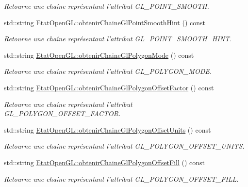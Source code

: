 \begin{DoxyCompactItemize}
\begin{DoxyCompactList}\small\item\em Retourne une chaîne représentant l'attribut G\-L\-\_\-\-P\-O\-I\-N\-T\-\_\-\-S\-M\-O\-O\-T\-H. \end{DoxyCompactList}\item 
std\-::string \hyperlink{group__utilitaire_gaa9c02409795d34b851b6da29f7f91c35}{Etat\-Open\-G\-L\-::obtenir\-Chaine\-Gl\-Point\-Smooth\-Hint} () const 
\begin{DoxyCompactList}\small\item\em Retourne une chaîne représentant l'attribut G\-L\-\_\-\-P\-O\-I\-N\-T\-\_\-\-S\-M\-O\-O\-T\-H\-\_\-\-H\-I\-N\-T. \end{DoxyCompactList}\item 
std\-::string \hyperlink{group__utilitaire_ga799784d6a719eb2c25ffd5854ec09aa8}{Etat\-Open\-G\-L\-::obtenir\-Chaine\-Gl\-Polygon\-Mode} () const 
\begin{DoxyCompactList}\small\item\em Retourne une chaîne représentant l'attribut G\-L\-\_\-\-P\-O\-L\-Y\-G\-O\-N\-\_\-\-M\-O\-D\-E. \end{DoxyCompactList}\item 
std\-::string \hyperlink{group__utilitaire_gaedc33f5a28be70057bb4b6124b67955a}{Etat\-Open\-G\-L\-::obtenir\-Chaine\-Gl\-Polygon\-Offset\-Factor} () const 
\begin{DoxyCompactList}\small\item\em Retourne une chaîne représentant l'attribut G\-L\-\_\-\-P\-O\-L\-Y\-G\-O\-N\-\_\-\-O\-F\-F\-S\-E\-T\-\_\-\-F\-A\-C\-T\-O\-R. \end{DoxyCompactList}\item 
std\-::string \hyperlink{group__utilitaire_ga5e5f7eacf5333293ba0f1a02bbe3cdc5}{Etat\-Open\-G\-L\-::obtenir\-Chaine\-Gl\-Polygon\-Offset\-Units} () const 
\begin{DoxyCompactList}\small\item\em Retourne une chaîne représentant l'attribut G\-L\-\_\-\-P\-O\-L\-Y\-G\-O\-N\-\_\-\-O\-F\-F\-S\-E\-T\-\_\-\-U\-N\-I\-T\-S. \end{DoxyCompactList}\item 
std\-::string \hyperlink{group__utilitaire_gaa4f958b650aeedc92140b1406f98d985}{Etat\-Open\-G\-L\-::obtenir\-Chaine\-Gl\-Polygon\-Offset\-Fill} () const 
\begin{DoxyCompactList}\small\item\em Retourne une chaîne représentant l'attribut G\-L\-\_\-\-P\-O\-L\-Y\-G\-O\-N\-\_\-\-O\-F\-F\-S\-E\-T\-\_\-\-F\-I\-L\-L. \end{DoxyCompactList}\item 

\end{DoxyCompactItemize}
